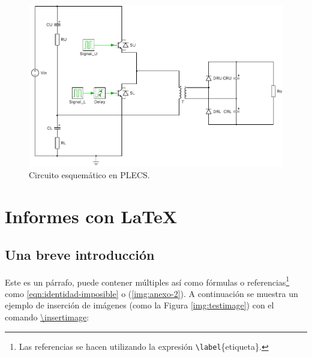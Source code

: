 \begin{figure}
	\centering
	\includegraphics[width=1\linewidth]{../schematic}
	\caption{Circuito esquemático en PLECS.}
	\label{fig:schematic}
\end{figure}



















\clearpage

\section{Informes con \LaTeX}

\subsection{Una breve introducción}
	
	Este es un párrafo, puede contener múltiples  así como fórmulas o referencias\footnote{Las referencias se hacen utilizando la expresión \texttt{\textbackslash label}\{etiqueta\}.} como \eqref{eqn:identidad-imposible} o (\ref{img:anexo-2}). A continuación se muestra un ejemplo de inserción de imágenes (como la Figura \ref{img:testimage}) con el comando \href{https://latex.ppizarror.com/informe.html#hlp-imagen}{\textbackslash insertimage}:


